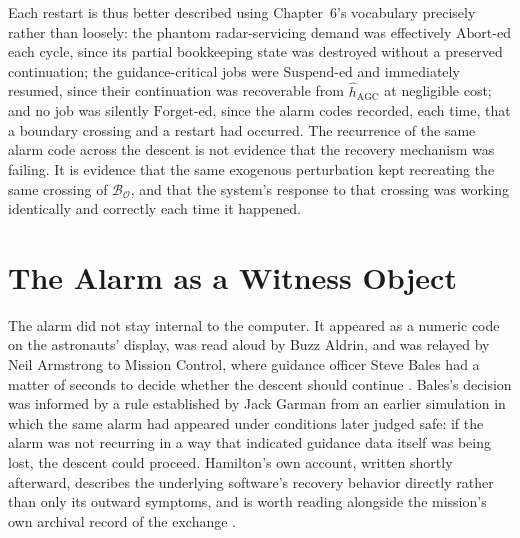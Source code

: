\documentclass[11pt]{report}
\newcommand{\Suspend}{\mathrm{Suspend}}
\newcommand{\Abort}{\mathrm{Abort}}
\newcommand{\Forget}{\mathrm{Forget}}
\begin{document}
Each restart is thus better described using Chapter~6's vocabulary precisely rather than loosely: the phantom radar-servicing demand was effectively $\Abort$-ed each cycle, since its partial bookkeeping state was destroyed without a preserved continuation; the guidance-critical jobs were $\Suspend$-ed and immediately resumed, since their continuation was recoverable from $\widehat h_{\mathrm{AGC}}$ at negligible cost; and no job was silently $\Forget$-ed, since the alarm codes recorded, each time, that a boundary crossing and a restart had occurred. The recurrence of the same alarm code across the descent is not evidence that the recovery mechanism was failing. It is evidence that the same exogenous perturbation kept recreating the same crossing of $\mathcal B_{\mathcal O}$, and that the system's response to that crossing was working identically and correctly each time it happened.

\chapter{The Alarm as a Witness Object}

The alarm did not stay internal to the computer. It appeared as a numeric code on the astronauts' display, was read aloud by Buzz Aldrin, and was relayed by Neil Armstrong to Mission Control, where guidance officer Steve Bales had a matter of seconds to decide whether the descent should continue \cite{nasaalsj1969,mindell2008}. Bales's decision was informed by a rule established by Jack Garman from an earlier simulation in which the same alarm had appeared under conditions later judged safe: if the alarm was not recurring in a way that indicated guidance data itself was being lost, the descent could proceed. Hamilton's own account, written shortly afterward, describes the underlying software's recovery behavior directly rather than only its outward symptoms, and is worth reading alongside the mission's own archival record of the exchange \cite{hamilton1971,nasaalsj1969}.
\end{document}
